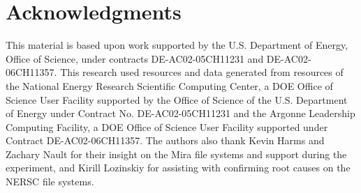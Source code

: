 \section*{Acknowledgments}

This material is based upon work supported by the U.S. Department of Energy,
Office of Science, under contracts DE-AC02-05CH11231 and DE-AC02-06CH11357.
This research used resources and data generated from resources of the
National Energy Research Scientific Computing Center, a DOE Office of
Science User Facility supported by the Office of Science of the U.S. Department of
Energy under Contract No. DE-AC02-05CH11231 and the Argonne Leadership
Computing Facility, a DOE Office of Science User Facility supported under
Contract DE-AC02-06CH11357.
The authors also thank Kevin Harms and Zachary Nault for their insight on the Mira file systems and support during the experiment, and Kirill Lozinskiy for assisting with confirming root causes on the NERSC file systems.